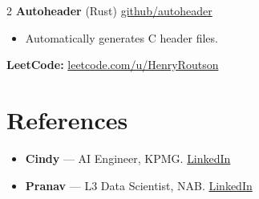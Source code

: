 \documentclass[10pt, a4paper]{article}
\begin{document}
\begin{multicols}{2}
\textbf{Autoheader} (Rust) \hfill \href{https://github.com/HenryRoutson/autoheader}{github/autoheader}
\begin{itemize}
  \item Automatically generates C header files.
\end{itemize}

\textbf{LeetCode:} \href{https://leetcode.com/u/HenryRoutson/}{leetcode.com/u/HenryRoutson}

\section{References}

\begin{itemize}
  \item \textbf{Cindy} --- AI Engineer, KPMG. \href{https://www.linkedin.com/in/runxin-liu/}{LinkedIn}
  \item \textbf{Pranav} --- L3 Data Scientist, NAB. \href{https://www.linkedin.com/in/pranavjayanty/}{LinkedIn}
\end{itemize}

\end{multicols}
\end{document}
